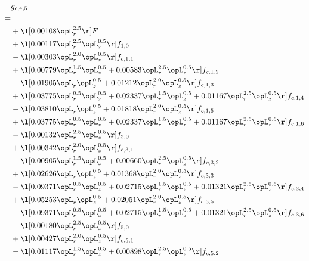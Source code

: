 \begin{alignat}{2} 
\label{eq:g_45_0} 
& g_{c,4,5} \nonumber \\ 
 = \\ 
& + \l[  0.00108 \opL_r^{2.5}  \r] F \nonumber \\ 
& + \l[  0.00117 \opL_r^{2.5} \opL_z^{0.5}  \r] f_{1,0} \nonumber \\ 
& - \l[  0.00303 \opL_r^{2.0} \opL_z^{0.5}  \r] f_{c,1,1} \nonumber \\ 
& + \l[  0.00779 \opL_r^{1.5} \opL_z^{0.5} +  0.00583 \opL_r^{2.5} \opL_z^{0.5}  \r] f_{c,1,2} \nonumber \\ 
& - \l[  0.01905 \opL_r \opL_z^{0.5} +  0.01212 \opL_r^{2.0} \opL_z^{0.5}  \r] f_{c,1,3} \nonumber \\ 
& + \l[  0.03775 \opL_r^{0.5} \opL_z^{0.5} +  0.02337 \opL_r^{1.5} \opL_z^{0.5} +  0.01167 \opL_r^{2.5} \opL_z^{0.5}  \r] f_{c,1,4} \nonumber \\ 
& - \l[  0.03810 \opL_r \opL_z^{0.5} +  0.01818 \opL_r^{2.0} \opL_z^{0.5}  \r] f_{c,1,5} \nonumber \\ 
& + \l[  0.03775 \opL_r^{0.5} \opL_z^{0.5} +  0.02337 \opL_r^{1.5} \opL_z^{0.5} +  0.01167 \opL_r^{2.5} \opL_z^{0.5}  \r] f_{c,1,6} \nonumber \\ 
& - \l[  0.00132 \opL_r^{2.5} \opL_z^{0.5}  \r] f_{3,0} \nonumber \\ 
& + \l[  0.00342 \opL_r^{2.0} \opL_z^{0.5}  \r] f_{c,3,1} \nonumber \\ 
& - \l[  0.00905 \opL_r^{1.5} \opL_z^{0.5} +  0.00660 \opL_r^{2.5} \opL_z^{0.5}  \r] f_{c,3,2} \nonumber \\ 
& + \l[  0.02626 \opL_r \opL_z^{0.5} +  0.01368 \opL_r^{2.0} \opL_z^{0.5}  \r] f_{c,3,3} \nonumber \\ 
& - \l[  0.09371 \opL_r^{0.5} \opL_z^{0.5} +  0.02715 \opL_r^{1.5} \opL_z^{0.5} +  0.01321 \opL_r^{2.5} \opL_z^{0.5}  \r] f_{c,3,4} \nonumber \\ 
& + \l[  0.05253 \opL_r \opL_z^{0.5} +  0.02051 \opL_r^{2.0} \opL_z^{0.5}  \r] f_{c,3,5} \nonumber \\ 
& - \l[  0.09371 \opL_r^{0.5} \opL_z^{0.5} +  0.02715 \opL_r^{1.5} \opL_z^{0.5} +  0.01321 \opL_r^{2.5} \opL_z^{0.5}  \r] f_{c,3,6} \nonumber \\ 
& - \l[  0.00180 \opL_r^{2.5} \opL_z^{0.5}  \r] f_{5,0} \nonumber \\ 
& + \l[  0.00427 \opL_r^{2.0} \opL_z^{0.5}  \r] f_{c,5,1} \nonumber \\ 
& - \l[  0.01117 \opL_r^{1.5} \opL_z^{0.5} +  0.00898 \opL_r^{2.5} \opL_z^{0.5}  \r] f_{c,5,2} \nonumber \\ 

\end{alignat}
